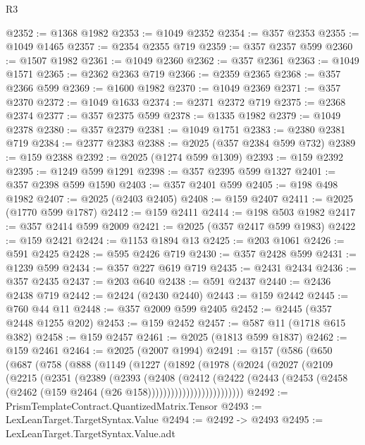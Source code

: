 \begin{lexlean}{R3}
\begin{coremodule}
@2352 := @1368 @1982
@2353 := @1049 @2352
@2354 := @357 @2353
@2355 := @1049 @1465
@2357 := @2354 @2355 @719
@2359 := @357 @2357 @599
@2360 := @1507 @1982
@2361 := @1049 @2360
@2362 := @357 @2361
@2363 := @1049 @1571
@2365 := @2362 @2363 @719
@2366 := @2359 @2365
@2368 := @357 @2366 @599
@2369 := @1600 @1982
@2370 := @1049 @2369
@2371 := @357 @2370
@2372 := @1049 @1633
@2374 := @2371 @2372 @719
@2375 := @2368 @2374
@2377 := @357 @2375 @599
@2378 := @1335 @1982
@2379 := @1049 @2378
@2380 := @357 @2379
@2381 := @1049 @1751
@2383 := @2380 @2381 @719
@2384 := @2377 @2383
@2388 := @2025 (@357 @2384 @599 @732)
@2389 := @159 @2388
@2392 := @2025 (@1274 @599 @1309)
@2393 := @159 @2392
@2395 := @1249 @599 @1291
@2398 := @357 @2395 @599 @1327
@2401 := @357 @2398 @599 @1590
@2403 := @357 @2401 @599
@2405 := @198 @498 @1982
@2407 := @2025 (@2403 @2405)
@2408 := @159 @2407
@2411 := @2025 (@1770 @599 @1787)
@2412 := @159 @2411
@2414 := @198 @503 @1982
@2417 := @357 @2414 @599 @2009
@2421 := @2025 (@357 @2417 @599 @1983)
@2422 := @159 @2421
@2424 := @1153 @1894 @13
@2425 := @203 @1061
@2426 := @591 @2425
@2428 := @595 @2426 @719
@2430 := @357 @2428 @599
@2431 := @1239 @599
@2434 := @357 @227 @619 @719
@2435 := @2431 @2434
@2436 := @357 @2435
@2437 := @203 @640
@2438 := @591 @2437
@2440 := @2436 @2438 @719
@2442 := @2424 (@2430 @2440)
@2443 := @159 @2442
@2445 := @760 @44 @11
@2448 := @357 @2009 @599 @2405
@2452 := @2445 (@357 @2448 @1255 @202)
@2453 := @159 @2452
@2457 := @587 @11 (@1718 @615 @382)
@2458 := @159 @2457
@2461 := @2025 (@1813 @599 @1837)
@2462 := @159 @2461
@2464 := @2025 (@2007 @1994)
@2491 := @157
    (@586
      (@650
        (@687
          (@758
            (@888
              (@1149
                (@1227
                  (@1892
                    (@1978
                      (@2024
                        (@2027
                          (@2109
                            (@2215
                              (@2351
                                (@2389
                                  (@2393
                                    (@2408
                                      (@2412
                                        (@2422
                                          (@2443
                                            (@2453
                                              (@2458
                                                (@2462
                                                  (@159 @2464 (@26 @158)))))))))))))))))))))))))
@2492 := PrismTemplateContract.QuantizedMatrix.Tensor
@2493 := LexLeanTarget.TargetSyntax.Value
@2494 := @2492 -> @2493
@2495 := LexLeanTarget.TargetSyntax.Value.adt

\end{coremodule}
\end{lexlean}
